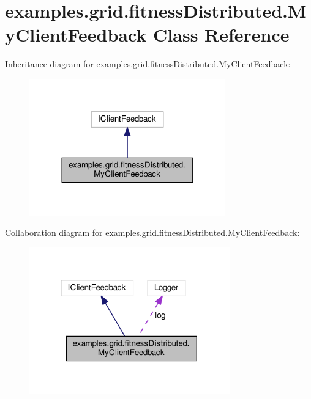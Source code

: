 \hypertarget{classexamples_1_1grid_1_1fitness_distributed_1_1_my_client_feedback}{\section{examples.\-grid.\-fitness\-Distributed.\-My\-Client\-Feedback Class Reference}
\label{classexamples_1_1grid_1_1fitness_distributed_1_1_my_client_feedback}
}


Inheritance diagram for examples.\-grid.\-fitness\-Distributed.\-My\-Client\-Feedback\-:
\nopagebreak
\begin{figure}[H]
\begin{center}
\leavevmode
\includegraphics[width=240pt]{classexamples_1_1grid_1_1fitness_distributed_1_1_my_client_feedback__inherit__graph}
\end{center}
\end{figure}


Collaboration diagram for examples.\-grid.\-fitness\-Distributed.\-My\-Client\-Feedback\-:
\nopagebreak
\begin{figure}[H]
\begin{center}
\leavevmode
\includegraphics[width=245pt]{classexamples_1_1grid_1_1fitness_distributed_1_1_my_client_feedback__coll__graph}
\end{center}
\end{figure}
